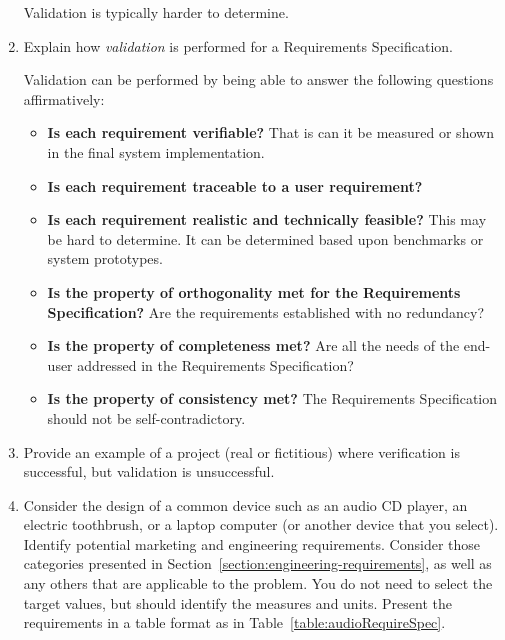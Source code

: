 \begin{enumerate}
\begin{onlysolution}
Validation is typically harder to determine.
\end{onlysolution}    
    
    
    
    
  \item
    Explain how \emph{validation} is performed for a Requirements Specification.
\begin{onlysolution}
Validation can be performed by being able to answer the following
questions affirmatively:

\begin{itemize}
\item \textbf{Is each requirement verifiable?} That is can it be measured or
shown in the final system implementation.
\item \textbf{Is each requirement traceable to a user requirement?}
\item \textbf{Is each requirement realistic and technically feasible?} This
may be hard to determine. It can be determined based upon benchmarks or
system prototypes.
\item \textbf{Is the property of orthogonality met for the Requirements
Specification?} Are the requirements established with no redundancy?
\item \textbf{Is the property of completeness met?} Are all the needs of the
end-user addressed in the Requirements Specification?
\item \textbf{Is the property of consistency met?} The Requirements
Specification should not be self-contradictory.
\end{itemize}
\end{onlysolution}    
    
  \item
    Provide an example of a project (real or fictitious) where
    verification is successful, but validation is unsuccessful.
    
  \item
  \label{list:identifyMarkEngr}
    Consider the design of a common device such as an audio CD player,
    an electric toothbrush, or a laptop computer (or another device that
    you select). Identify potential marketing and engineering
    requirements. Consider those categories presented in 
    Section~\ref{section:engineering-requirements}, as
    well as any others that are applicable to the problem. You do not
    need to select the target values, but should identify the measures
    and units. Present the requirements in a table format as in 
    Table~\ref{table:audioRequireSpec}.
 \begin{onlysolution}
 

\end{onlysolution}
\end{enumerate}
